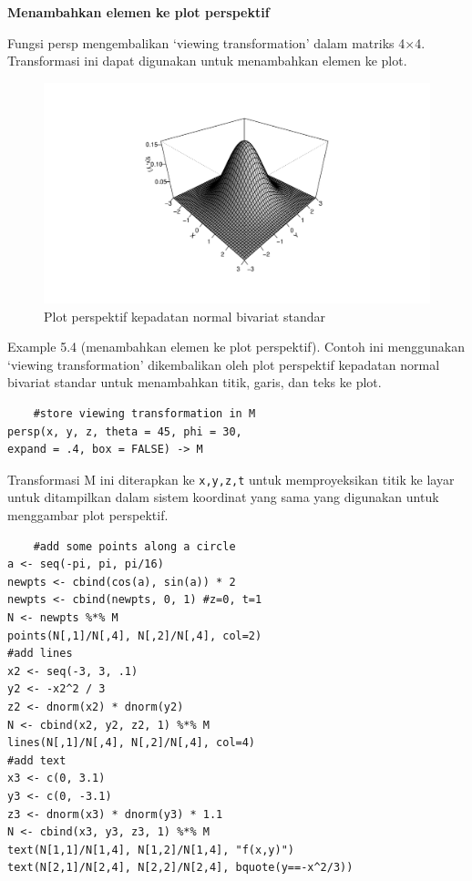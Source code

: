 \documentclass[a4paper,12pt]{article}
\theoremstyle{definition}
\begin{document}
\textbf{Menambahkan elemen ke plot perspektif}

Fungsi persp mengembalikan ‘viewing transformation' dalam matriks 4×4. Transformasi ini dapat digunakan untuk menambahkan elemen ke plot.

\begin{figure}[H]
    \centering
    \includegraphics[width=16cm]{gb/K2G7-Scatterplot.pdf}
    \caption{Plot perspektif kepadatan normal bivariat standar}
    \label{fig:my_label}
\end{figure}

Example 5.4 (menambahkan elemen ke plot perspektif). Contoh ini menggunakan ‘viewing transformation’ dikembalikan oleh plot perspektif kepadatan normal bivariat standar untuk menambahkan titik, garis, dan teks ke plot.

\begin{lstlisting}
    #store viewing transformation in M 
persp(x, y, z, theta = 45, phi = 30, 
expand = .4, box = FALSE) -> M
\end{lstlisting}

Transformasi M ini diterapkan ke \texttt{x,y,z,t} untuk memproyeksikan titik ke layar
untuk ditampilkan dalam sistem koordinat yang sama yang digunakan untuk menggambar plot perspektif.
\begin{lstlisting}
    #add some points along a circle
a <- seq(-pi, pi, pi/16)
newpts <- cbind(cos(a), sin(a)) * 2
newpts <- cbind(newpts, 0, 1) #z=0, t=1
N <- newpts %*% M
points(N[,1]/N[,4], N[,2]/N[,4], col=2)
#add lines
x2 <- seq(-3, 3, .1)
y2 <- -x2^2 / 3
z2 <- dnorm(x2) * dnorm(y2)
N <- cbind(x2, y2, z2, 1) %*% M
lines(N[,1]/N[,4], N[,2]/N[,4], col=4)
#add text
x3 <- c(0, 3.1)
y3 <- c(0, -3.1)
z3 <- dnorm(x3) * dnorm(y3) * 1.1
N <- cbind(x3, y3, z3, 1) %*% M
text(N[1,1]/N[1,4], N[1,2]/N[1,4], "f(x,y)")
text(N[2,1]/N[2,4], N[2,2]/N[2,4], bquote(y==-x^2/3))
\end{lstlisting}
\end{document}
